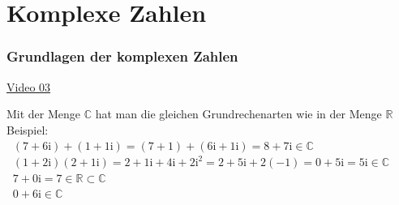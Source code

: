\chapter{Komplexe Zahlen}
 \setcounter{section}{3}
\setcounter{subsection}{0}
\setcounter{subsubsection}{1}
\setcounter{secnumdepth}{3}
\subsection{Grundlagen der komplexen Zahlen }
\href{https://youtu.be/k6ZBEYDOrY0}{Video 03}\\
\begin{center}
\end{center}
Mit der Menge $  \mathbb{C} $ hat man die gleichen Grundrechenarten wie in der Menge $ \mathbb{R} $\vspace*{2mm}\\
Beispiel:\\
\textbullet $ \;\;(7+6\mathrm{i})+(1+1\mathrm{i})=(7+1)+(6\mathrm{i}+1\mathrm{i})=8+7\mathrm{i} \in  \mathbb{C}$\\
\textbullet $ \;\;(1+2\mathrm{i}) (2+1\mathrm{i})=2+1\mathrm{i}+4\mathrm{i}+2\mathrm{i}^2=2+5\mathrm{i}+2(-1)=0+5\mathrm{i}=5\mathrm{i} \in  \mathbb{C}$\\
\textbullet $ \;\;7+0\mathrm{i}=7 \in \mathbb{R}\subset  \mathbb{C} $\\
\textbullet $\;\; 0+6\mathrm{i} \in  \mathbb{C} $\\
\begin{center}
\end{center}
